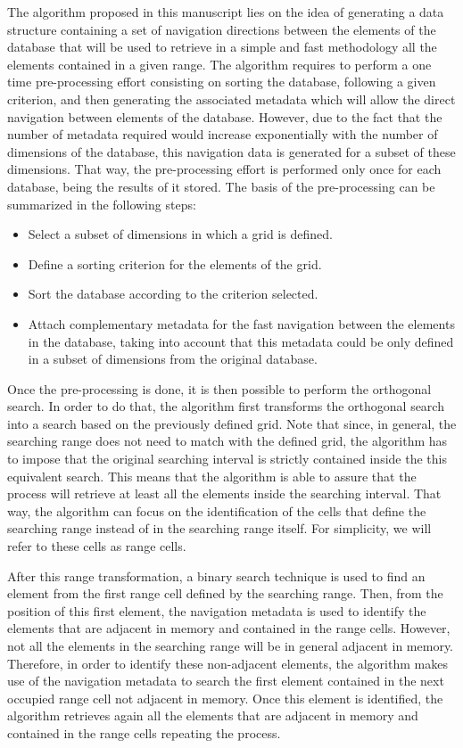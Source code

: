 \documentclass[review]{elsarticle}
\begin{document}
The algorithm proposed in this manuscript lies on the idea of generating a data structure containing a set of navigation directions between the elements of the database that will be used to retrieve in a simple and fast methodology all the elements contained in a given range. The algorithm requires to perform a one time pre-processing effort consisting on sorting the database, following a given criterion, and then generating the associated metadata which will allow the direct navigation between elements of the database. However, due to the fact that the number of metadata required would increase exponentially with the number of dimensions of the database, this navigation data is generated for a subset of these dimensions. That way, the pre-processing effort is performed only once for each database, being the results of it stored. The basis of the pre-processing can be summarized in the following steps:
\begin{itemize}
  \item Select a subset of dimensions in which a grid is defined.
  \item Define a sorting criterion for the elements of the grid.
  \item Sort the database according to the criterion selected.
  \item Attach complementary metadata for the fast navigation between the elements in the database, taking into account that this metadata could be only defined in a subset of dimensions from the original database.
\end{itemize}

Once the pre-processing is done, it is then possible to perform the orthogonal search. In order to do that, the algorithm first transforms the orthogonal search into a search based on the previously defined grid. Note that since, in general, the searching range does not need to match with the defined grid, the algorithm has to impose that the original searching interval is strictly contained inside the this equivalent search. This means that the algorithm is able to assure that the process will retrieve at least all the elements inside the searching interval. That way, the algorithm can focus on the identification of the cells that define the searching range instead of in the searching range itself. For simplicity, we will refer to these cells as range cells.

After this range transformation, a binary search technique is used to find an element from the first range cell defined by the searching range. Then, from the position of this first element, the navigation metadata is used to identify the elements that are adjacent in memory and contained in the range cells. However, not all the elements in the searching range will be in general adjacent in memory. Therefore, in order to identify these non-adjacent elements, the algorithm makes use of the navigation metadata to search the first element contained in the next occupied range cell not adjacent in memory. Once this element is identified, the algorithm retrieves again all the elements that are adjacent in memory and contained in the range cells repeating the process.
\end{document}
